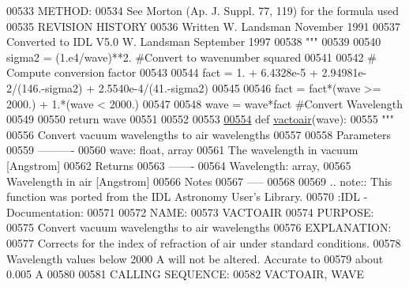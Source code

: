 \begin{DoxyCode}
00533 \textcolor{stringliteral}{METHOD:}
00534 \textcolor{stringliteral}{See Morton (Ap. J. Suppl. 77, 119) for the formula used}
00535 \textcolor{stringliteral}{REVISION HISTORY}
00536 \textcolor{stringliteral}{Written W. Landsman November 1991}
00537 \textcolor{stringliteral}{Converted to IDL V5.0 W. Landsman September 1997}
00538 \textcolor{stringliteral}{    """}
00539     
00540     sigma2 = (1.e4/wave)**2. \textcolor{comment}{#Convert to wavenumber squared}
00541     
00542     \textcolor{comment}{# Compute conversion factor}
00543     
00544     fact = 1. + 6.4328e-5 + 2.94981e-2/(146.-sigma2) + 2.5540e-4/(41.-sigma2)
00545     
00546     fact = fact*(wave >= 2000.) + 1.*(wave < 2000.)
00547     
00548     wave = wave*fact \textcolor{comment}{#Convert Wavelength}
00549     
00550     \textcolor{keywordflow}{return} wave
00551 
00552 
00553 
\hypertarget{physics_8py_source_l00554}{}\hyperlink{namespacepyneb_1_1utils_1_1physics_aafb02f69e32ab62fa89420481f9a65f4}{00554} \textcolor{keyword}{def }\hyperlink{namespacepyneb_1_1utils_1_1physics_aafb02f69e32ab62fa89420481f9a65f4}{vactoair}(wave):
00555     \textcolor{stringliteral}{"""}
00556 \textcolor{stringliteral}{Convert vacuum wavelengths to air wavelengths}
00557 \textcolor{stringliteral}{}
00558 \textcolor{stringliteral}{Parameters}
00559 \textcolor{stringliteral}{----------}
00560 \textcolor{stringliteral}{wave: float, array}
00561 \textcolor{stringliteral}{The wavelength in vacuum [Angstrom]}
00562 \textcolor{stringliteral}{Returns}
00563 \textcolor{stringliteral}{-------}
00564 \textcolor{stringliteral}{Wavelength: array,}
00565 \textcolor{stringliteral}{Wavelength in air [Angstrom]}
00566 \textcolor{stringliteral}{Notes}
00567 \textcolor{stringliteral}{-----}
00568 \textcolor{stringliteral}{}
00569 \textcolor{stringliteral}{.. note:: This function was ported from the IDL Astronomy User's Library.}
00570 \textcolor{stringliteral}{:IDL - Documentation:}
00571 \textcolor{stringliteral}{}
00572 \textcolor{stringliteral}{NAME:}
00573 \textcolor{stringliteral}{VACTOAIR}
00574 \textcolor{stringliteral}{PURPOSE:}
00575 \textcolor{stringliteral}{Convert vacuum wavelengths to air wavelengths}
00576 \textcolor{stringliteral}{EXPLANATION:}
00577 \textcolor{stringliteral}{Corrects for the index of refraction of air under standard conditions.}
00578 \textcolor{stringliteral}{Wavelength values below 2000 A will not be altered. Accurate to}
00579 \textcolor{stringliteral}{about 0.005 A}
00580 \textcolor{stringliteral}{}
00581 \textcolor{stringliteral}{CALLING SEQUENCE:}
00582 \textcolor{stringliteral}{VACTOAIR, WAVE}

\end{DoxyCode}
